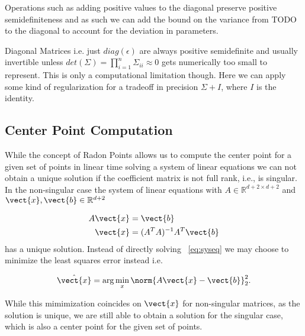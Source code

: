 Operations such as adding positive values to the diagonal preserve positive semidefiniteness and as such we can add the bound on the variance from TODO to the diagonal to account for the deviation in parameters.

Diagonal Matrices i.e. just $diag(\epsilon)$ are always positive semidefinite and usually invertible unless $det(\Sigma) = \prod_{i=1}^n \Sigma_{ii} \approx 0$ gets numerically too small to represent. This is only a computational limitation though. Here we can apply some kind of regularization for a tradeoff in precision $\Sigma + I$, where $I$ is the identity.

\subsection{Center Point Computation}
While the concept of Radon Points allows us to compute the center point for a given set of points in linear time solving a system of linear equations we can not obtain a unique solution if the coefficient matrix is not full rank, i.e., is singular.
In the non-singular case the system of linear equations with $A \in \mathbb{R}^{d+2 \times d+2}$ and $\vect{x}, \vect{b} \in \mathbb{R}^{d+2}$

\begin{equation}
    \label{eq:syseq}
    \begin{split}
        A\vect{x} &= \vect{b} \\
        \vect{x} &= (A^TA)^{-1}A^T \vect{b}
    \end{split}
\end{equation}
has a unique solution.
Instead of directly solving \eq~\ref{eq:syseq} we may choose to minimize the least squares error instead i.e.

\begin{equation}
    \hat{\vect{x}} = \arg\min_{x} \norm{A\vect{x} - \vect{b}}^2_2.
\end{equation}

While this mimimization coincides on $\vect{x}$ for non-singular matrices, as the solution is unique, we are still able to obtain a solution for the singular case, which is also a center point for the given set of points.
